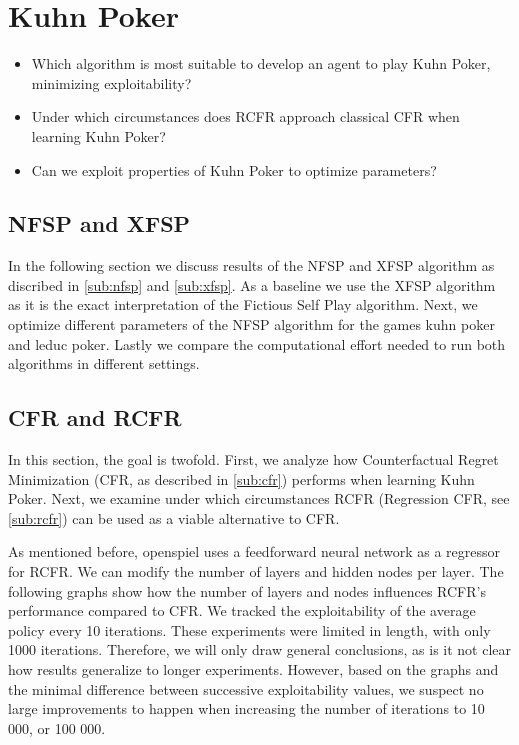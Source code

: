 \documentclass[10pt,a4paper]{article}
\begin{document}
\section{Kuhn Poker}
\begin{tcolorbox}
\begin{itemize}
\item{Which algorithm is most suitable to develop an agent to play Kuhn Poker, minimizing exploitability?}
\item{Under which circumstances does RCFR approach classical CFR when learning Kuhn Poker?}
\item{Can we exploit properties of Kuhn Poker to optimize parameters?}
\end{itemize}
\end{tcolorbox}

\subsection{NFSP and XFSP}
In the following section we discuss results of the NFSP and XFSP algorithm as discribed in \ref{sub:nfsp} and \ref{sub:xfsp}. As a baseline we use the XFSP algorithm as it is the exact interpretation of the Fictious Self Play algorithm. Next, we optimize different parameters of the NFSP algorithm for the games kuhn poker and leduc poker. Lastly we compare the computational effort needed to run both algorithms in different settings.


\subsection{CFR and RCFR}
In this section, the goal is twofold. First, we analyze how Counterfactual Regret Minimization (CFR, as described in \ref{sub:cfr}) performs when learning Kuhn Poker. Next, we examine under which circumstances RCFR (Regression CFR, see \ref{sub:rcfr}) can be used as a viable alternative to CFR.

As mentioned before, openspiel uses a feedforward neural network as a regressor for RCFR. We can modify the number of layers and hidden nodes per layer. The following graphs show how the number of layers and nodes influences RCFR's performance compared to CFR. We tracked the exploitability of the average policy every 10 iterations. These experiments were limited in length, with only 1000 iterations. Therefore, we will only draw general conclusions, as is it not clear how results generalize to longer experiments. However, based on the graphs and the minimal difference between successive exploitability values, we suspect no large improvements to happen when increasing the number of iterations to 10 000, or 100 000.
 
\end{document}
